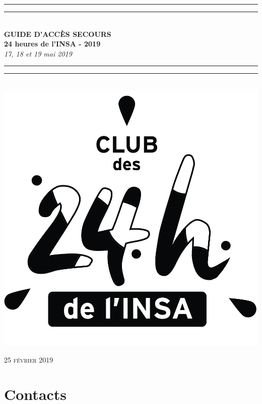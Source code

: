 \documentclass[hidelinks, paper=a4, fontsize=13pt]{report}
\begin{document}
\begin{center}
	\rule[0.5ex]{\linewidth}{2pt}\vspace*{-\baselineskip}\vspace*{3.2pt}
	\rule[0.5ex]{\linewidth}{1pt}\\[\baselineskip]
	\huge \textbf{GUIDE D'ACCÈS SECOURS\\24 heures de l'INSA - 2019} \\[4mm]
	{\Large \textit{17, 18 et 19 mai 2019}}\\
	\rule[0.5ex]{\linewidth}{1pt}\vspace*{-\baselineskip}\vspace{3.2pt}
	\rule[0.5ex]{\linewidth}{2pt}\\
	\vspace{30mm}
	\includegraphics[scale=0.3]{Annexes/Images_Acces/logo24h}\\
	
	\vspace{50mm}

\end{center}
	\begin{flushright}
		{\large\textsc{25 février 2019}}
\end{flushright}

\chapter*{Contacts}
\end{document}
